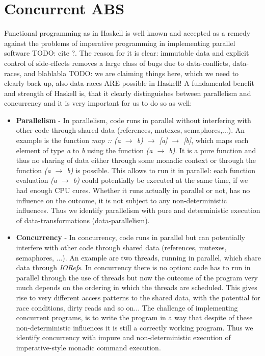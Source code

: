 \chapter{Concurrent ABS}
\label{ch:concurrent_abs}
Functional programming as in Haskell is well known and accepted as a remedy against the problems of imperative programming in implementing parallel software TODO: cite ?. The reason for it is clear: immutable data and explicit control of side-effects removes a large class of bugs due to data-conflicts, data-races, and blablabla TODO: we are claiming things here, which we need to clearly back up, also data-races ARE possible in Haskell! A fundamental benefit and strength of Haskell is, that it clearly distinguishes between parallelism and concurrency \cite{jones_tackling_2002} and it is very important for us to do so as well:

\begin{itemize}
	\item \textbf{Parallelism} - In parallelism, code runs in parallel without interfering with other code through shared data (references, mutexes, semaphores,...). An example is the function \textit{map :: (a $\rightarrow$ b) $\rightarrow$ [a] $\rightarrow$ [b]}, which maps each element of type \textit{a} to \textit{b} using the function \textit{(a $\rightarrow$ b)}. It is a pure function and thus no sharing of data either through some monadic context or through the function \textit{(a $\rightarrow$ b)} is possible. This allows to run it in parallel: each function evaluation \textit{(a $\rightarrow$ b)} could potentially be executed at the same time, if we had enough CPU cures. Whether it runs actually in parallel or not, has no influence on the outcome, it is not subject to any non-deterministic influences. Thus we identify parallelism with pure and deterministic execution of data-transformations (data-parallelism).
	
	\item \textbf{Concurrency} - In concurrency, code runs in parallel but can potentially interfere with other code through shared data (references, mutexes, semaphores, ...). An example are two threads, running in parallel, which share data through \textit{IORefs}. In concurrency there is no option: code has to run in parallel through the use of threads but now the outcome of the program very much depends on the ordering in which the threads are scheduled. This gives rise to very different access patterns to the shared data, with the potential for race conditions, dirty reads and so on... The challenge of implementing concurrent programs, is to write the program in a way that despite of these non-deterministic influences it is still a correctly working program. Thus we identify concurrency with impure and non-deterministic execution of imperative-style monadic command execution.
\end{itemize}

